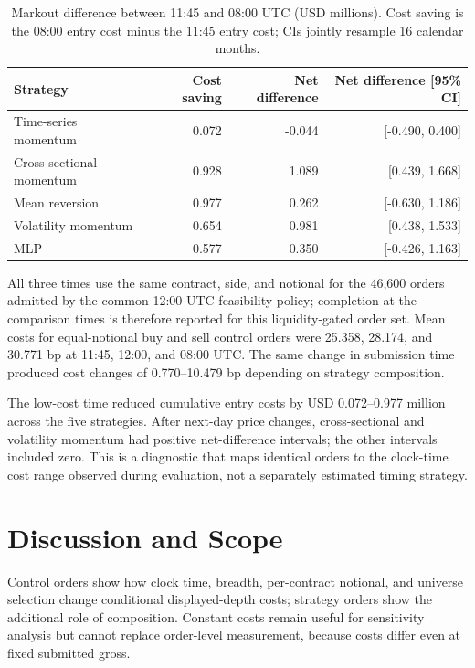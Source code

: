\documentclass[sigconf]{acmart}
\begin{document}
\begin{table}[tbp]
\centering
\footnotesize
\setlength{\tabcolsep}{3.1pt}
\begin{tabular}{@{}lrrr@{}}
\toprule
Strategy & Cost saving & Net difference & Net difference [95\% CI] \\
\midrule
Time-series momentum & 0.072 & -0.044 & [-0.490, 0.400] \\
Cross-sectional momentum & 0.928 & 1.089 & [0.439, 1.668] \\
Mean reversion & 0.977 & 0.262 & [-0.630, 1.186] \\
Volatility momentum & 0.654 & 0.981 & [0.438, 1.533] \\
MLP & 0.577 & 0.350 & [-0.426, 1.163] \\
\bottomrule
\end{tabular}
\caption{Markout difference between 11:45 and 08:00 UTC (USD millions). Cost saving is the 08:00 entry cost minus the 11:45 entry cost; CIs jointly resample 16 calendar months.}
\label{tab:paired-clock-effects}
\end{table}

All three times use the same contract, side, and notional for the 46,600 orders admitted by the common 12:00 UTC feasibility policy; completion at the comparison times is therefore reported for this liquidity-gated order set. Mean costs for equal-notional buy and sell control orders were 25.358, 28.174, and 30.771 bp at 11:45, 12:00, and 08:00 UTC. The same change in submission time produced cost changes of 0.770--10.479 bp depending on strategy composition.

The low-cost time reduced cumulative entry costs by USD 0.072--0.977 million across the five strategies. After next-day price changes, cross-sectional and volatility momentum had positive net-difference intervals; the other intervals included zero. This is a diagnostic that maps identical orders to the clock-time cost range observed during evaluation, not a separately estimated timing strategy.

\section{Discussion and Scope}
Control orders show how clock time, breadth, per-contract notional, and universe selection change conditional displayed-depth costs; strategy orders show the additional role of composition. Constant costs remain useful for sensitivity analysis but cannot replace order-level measurement, because costs differ even at fixed submitted gross.
\end{document}
